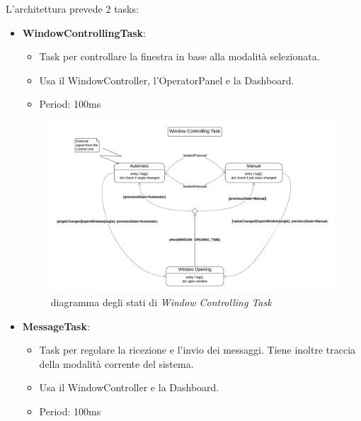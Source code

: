 \documentclass{report}
\begin{document}
\par{
L'architettura prevede 2 tasks: 
}
\begin{itemize}
    \item {
    \textbf{WindowControllingTask}: 
    \begin{itemize}
        \item {Task per controllare la finestra in base alla modalità selezionata.
        }
        \item {Usa il WindowController, l'OperatorPanel e la Dashboard.
        }
        \item {Period: 100ms
        }
    \end{itemize}
    \begin{figure}[H]
        \centering
        \includegraphics[width=1.2\linewidth]{img/assignment-03/WindowControllingTask.png}
        \caption{diagramma degli stati di \textit{Window Controlling Task}}
        \label{fig:window-controlling-task}
    \end{figure}
    }
    \item {
    \textbf{MessageTask}: 
    \begin{itemize}
        \item {Task per regolare la ricezione e l'invio dei messaggi. Tiene inoltre traccia della modalità corrente del sistema.
        }
        \item {Usa il WindowController e la Dashboard.
        }
        \item {Period: 100ms
        }
    \end{itemize}
    \begin{figure}[H]
        \centering

\end{figure}}
\end{itemize}
\end{document}
